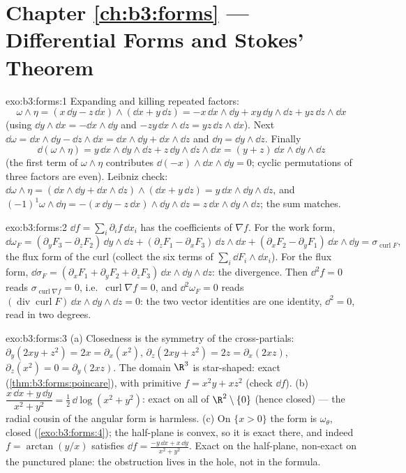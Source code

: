 \section*{Chapter \ref{ch:b3:forms} --- Differential Forms and
Stokes' Theorem}

\begin{solution}{exo:b3:forms:1}
Expanding and killing repeated factors:
\[
\omega\wedge\eta = (x\,\dd y - z\,\dd x)\wedge(\dd x +
y\,\dd z)
= -x\,\dd x\wedge\dd y + xy\,\dd y\wedge\dd z +
yz\,\dd z\wedge\dd x
\]
(using $\dd y\wedge\dd x = -\dd x\wedge\dd y$ and $-zy\,\dd
x\wedge\dd z = yz\,\dd z\wedge\dd x$). Next $\dd\omega =
\dd x\wedge\dd y - \dd z\wedge\dd x = \dd x\wedge\dd y +
\dd x\wedge\dd z$ and $\dd\eta = \dd y\wedge\dd z$. Finally
\[
\dd(\omega\wedge\eta) = y\,\dd x\wedge\dd y\wedge\dd z +
z\,\dd y\wedge\dd z\wedge\dd x = (y + z)\,\dd x\wedge\dd
y\wedge\dd z
\]
(the first term of $\omega\wedge\eta$ contributes $\dd(-x)
\wedge\dd x\wedge\dd y = 0$; cyclic permutations of three
factors are even). Leibniz check: $\dd\omega\wedge\eta =
(\dd x\wedge\dd y + \dd x\wedge\dd z)\wedge(\dd x + y\,\dd
z) = y\,\dd x\wedge\dd y\wedge\dd z$, and
$(-1)^1\omega\wedge\dd\eta = -(x\,\dd y - z\,\dd
x)\wedge\dd y\wedge\dd z = z\,\dd x\wedge\dd y\wedge\dd z$;
the sum matches.
\end{solution}

\begin{solution}{exo:b3:forms:2}
$\dd f = \sum_i\partial_if\,\dd x_i$ has the coefficients of
$\nabla f$. For the work form,
\[
\dd\omega_F = (\partial_yF_3 - \partial_zF_2)\,\dd y\wedge\dd
z + (\partial_zF_1 - \partial_xF_3)\,\dd z\wedge\dd x +
(\partial_xF_2 - \partial_yF_1)\,\dd x\wedge\dd y =
\sigma_{\operatorname{curl}F},
\]
the flux form of the curl (collect the six terms of
$\sum_i\dd F_i\wedge\dd x_i$). For the flux form,
$\dd\sigma_F = (\partial_xF_1 + \partial_yF_2 +
\partial_zF_3)\,\dd x\wedge\dd y\wedge\dd z$: the
divergence. Then $\dd^2f = 0$ reads
$\sigma_{\operatorname{curl}\nabla f} = 0$, i.e.\
$\operatorname{curl}\nabla f = 0$, and $\dd^2\omega_F = 0$
reads $(\operatorname{div}\operatorname{curl}F)\,\dd
x\wedge\dd y\wedge\dd z = 0$: the two vector identities are
one identity, $\dd^2 = 0$, read in two degrees.
\end{solution}

\begin{solution}{exo:b3:forms:3}
(a) Closedness is the symmetry of the cross-partials:
$\partial_y(2xy + z^2) = 2x = \partial_x(x^2)$,
$\partial_z(2xy + z^2) = 2z = \partial_x(2xz)$,
$\partial_z(x^2) = 0 = \partial_y(2xz)$. The domain $\R^3$
is star-shaped: exact (\cref{thm:b3:forms:poincare}), with
primitive $f = x^2y + xz^2$ (check $\dd f$).
(b) $\dfrac{x\,\dd x + y\,\dd y}{x^2 + y^2} =
\tfrac12\,\dd\log(x^2 + y^2)$: exact on all of
$\R^2\setminus\{0\}$ (hence closed) --- the radial cousin of
the angular form is harmless.
(c) On $\{x > 0\}$ the form is $\omega_\theta$, closed
(\cref{exo:b3:forms:4}); the half-plane is convex, so it is
exact there, and indeed $f = \arctan(y/x)$ satisfies $\dd f
= \frac{-y\,\dd x + x\,\dd y}{x^2 + y^2}$. Exact on the
half-plane, non-exact on the punctured plane: the
obstruction lives in the hole, not in the formula.
\end{solution}

